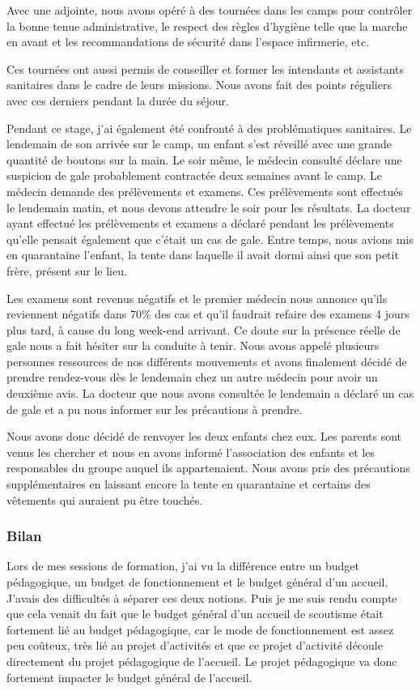 \documentclass[titlepage,11pt,a4paper]{article}
\begin{document}
Avec une adjointe, nous avons opéré à des tournées dans les camps pour contrôler la bonne
tenue administrative, le respect des règles d'hygiène telle que la marche en avant et les recommandations
de sécurité dans l'espace infirmerie, etc.

Ces tournées ont aussi permis de conseiller et former les intendants et assistants
sanitaires dans le cadre de leurs missions. Nous avons fait des points réguliers avec ces
derniers pendant la durée du séjour.

Pendant ce stage, j'ai également été confronté à des problématiques
sanitaires. Le lendemain de son arrivée sur le camp, un enfant s'est réveillé avec une
grande quantité de boutons sur la main. Le soir même, le médecin consulté déclare une
suspicion de gale probablement contractée deux semaines avant le camp. Le médecin demande
des prélèvements et examens. Ces prélèvements sont effectués
le lendemain matin, et nous devons attendre le soir pour les résultats. La docteur ayant
effectué les prélèvements et examens a déclaré pendant les prélèvements qu'elle pensait
également que c'était un cas de gale. Entre temps, nous avions mis en quarantaine
l'enfant, la tente dans laquelle il avait dormi ainsi que son petit frère, présent sur le
lieu.

Les examens sont revenus négatifs et le premier médecin nous annonce qu'ils reviennent
négatifs dans 70\% des cas et qu'il faudrait refaire des examens 4 jours plus tard, à cause du long
week-end arrivant. Ce doute sur la présence réelle de gale nous a fait hésiter sur la
conduite à tenir. Nous avons appelé plusieurs personnes ressources de nos différents
mouvements et avons finalement décidé de prendre rendez-vous dès le lendemain chez un
autre médecin pour avoir un deuxième avis. La docteur que nous avons consultée le
lendemain a déclaré un cas de gale et a pu nous informer sur les précautions à prendre.

Nous avons donc décidé de renvoyer les deux enfants chez eux. Les parents sont venus les
chercher et nous en avons informé l'association des enfants et les responsables du groupe
auquel ils appartenaient. Nous avons pris des précautions supplémentaires en laissant
encore la tente en quarantaine et certains des vêtements qui auraient pu être touchés.

\subsubsection{Bilan}

Lors de mes sessions de formation, j'ai vu la différence entre un budget pédagogique, un
budget de fonctionnement et le budget général d'un accueil. J'avais des difficultés à
séparer ces deux notions. Puis je me suis rendu compte que cela venait du fait que le budget général d'un
accueil de scoutisme était fortement lié au budget pédagogique, car le mode de
fonctionnement est assez peu coûteux, très lié au projet d'activités et que ce projet
d'activité découle directement du projet pédagogique de l'accueil. Le projet pédagogique
va donc fortement impacter le budget général de l'accueil.
\end{document}
